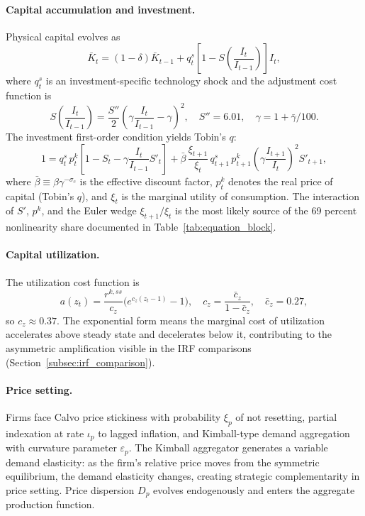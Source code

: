 \documentclass[12pt]{article}
\theoremstyle{plain}
\theoremstyle{definition}
\theoremstyle{remark}
\begin{document}
\paragraph{Capital accumulation and investment.} Physical capital evolves as
\[
\bar{K}_t = (1-\delta)\bar{K}_{t-1} + q_t^s \left[1 - S\!\left(\frac{I_t}{I_{t-1}}\right)\right] I_t,
\]
where $q_t^s$ is an investment-specific technology shock and the adjustment cost function is
\[
S\!\left(\frac{I_t}{I_{t-1}}\right) = \frac{S''}{2}\left(\gamma \frac{I_t}{I_{t-1}} - \gamma\right)^2, \quad S'' = 6.01, \quad \gamma = 1 + \bar{\gamma}/100.
\]
The investment first-order condition yields Tobin's $q$:
\[
1 = q_t^s \, p_t^k \!\left[1 - S_t - \gamma \frac{I_t}{I_{t-1}} S'_t\right] + \bar{\beta}\,\frac{\xi_{t+1}}{\xi_t}\,q_{t+1}^s \, p_{t+1}^k \left(\gamma \frac{I_{t+1}}{I_t}\right)^2 S'_{t+1},
\]
where $\bar{\beta} \equiv \beta \gamma^{-\sigma_c}$ is the effective discount factor, $p_t^k$ denotes the real price of capital (Tobin's $q$), and $\xi_t$ is the marginal utility of consumption. The interaction of $S'$, $p^k$, and the Euler wedge $\xi_{t+1}/\xi_t$ is the most likely source of the 69 percent nonlinearity share documented in Table~\ref{tab:equation_block}.

\paragraph{Capital utilization.} The utilization cost function is
\[
a(z_t) = \frac{r^{k,ss}}{c_z}\bigl(e^{c_z(z_t - 1)} - 1\bigr), \quad c_z = \frac{\bar{c}_z}{1 - \bar{c}_z}, \quad \bar{c}_z = 0.27,
\]
so $c_z \approx 0.37$. The exponential form means the marginal cost of utilization accelerates above steady state and decelerates below it, contributing to the asymmetric amplification visible in the IRF comparisons (Section~\ref{subsec:irf_comparison}).

\paragraph{Price setting.} Firms face Calvo price stickiness with probability $\xi_p$ of not resetting, partial indexation at rate $\iota_p$ to lagged inflation, and Kimball-type demand aggregation with curvature parameter $\varepsilon_p$. The Kimball aggregator generates a variable demand elasticity: as the firm's relative price moves from the symmetric equilibrium, the demand elasticity changes, creating strategic complementarity in price setting. Price dispersion $D_p$ evolves endogenously and enters the aggregate production function.
\end{document}
